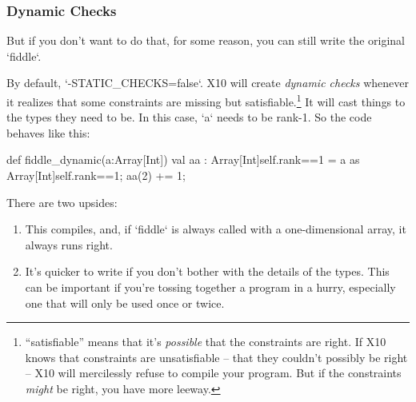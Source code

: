 \subsubsection{Dynamic Checks}


But if you don't want to do that, for some reason, you can still write the
original \xcd`fiddle`.  

By default, \xcd`-STATIC_CHECKS=false`.  X10 will create {\em dynamic checks}
whenever it realizes that some constraints are missing but
satisfiable.\footnote{``satisfiable'' means that it's {\em possible} that the
constraints are right.  If X10 knows that constraints are unsatisfiable --
that they couldn't possibly be right -- X10 will mercilessly refuse to compile
your program.  But if the constraints {\em might} be right, you have more
leeway.} 
It will cast things to the types they need to be.  
In this case, \xcd`a` needs to be rank-1.  So the code behaves like this:
\begin{xtennum}[]
def fiddle_dynamic(a:Array[Int]) {
  val aa : Array[Int]{self.rank==1} 
         = a as Array[Int]{self.rank==1};
  aa(2) += 1;
}
\end{xtennum}

There are two upsides:
\begin{enumerate}
\item This compiles, and, if \xcd`fiddle` is always called
with a one-dimensional array, it always runs right.  
\item It's quicker to write if you don't bother with the details of the types.
      This can be important if you're tossing together a program in a hurry,
      especially one that will only be used once or twice. 
\end{enumerate}

